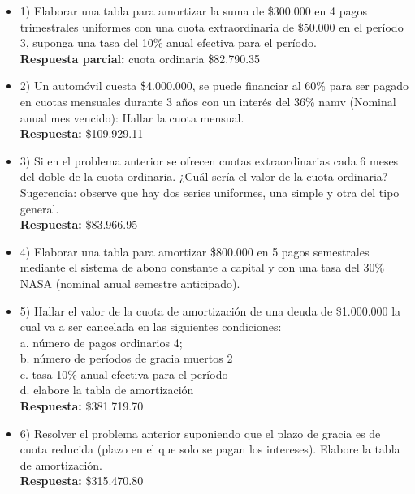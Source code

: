 \begin{itemize}
	\item 1)	Elaborar una tabla para amortizar la suma de \$300.000 en 4 pagos trimestrales uniformes con una cuota extraordinaria de \$50.000 en el período 3, suponga una tasa del 10\% anual efectiva para el período. \\
	\textbf{Respuesta parcial:} cuota ordinaria \$82.790.35
	\medskip
	
	\item 2)	Un automóvil cuesta \$4.000.000, se puede financiar al 60\% para ser pagado en cuotas mensuales durante 3 años con un interés del 36\% namv (Nominal anual mes vencido): Hallar la cuota mensual.\\
	\textbf{ Respuesta:} \$109.929.11
	\medskip
	
	\item 3)	Si en el problema anterior se ofrecen cuotas extraordinarias cada 6 meses del doble de la cuota ordinaria. ¿Cuál sería el valor de la cuota ordinaria?\\
	
	Sugerencia: observe que hay dos series uniformes, una simple y otra del tipo general.\\
	\textbf{Respuesta:} \$83.966.95
	\medskip
	
	\item 4)	Elaborar una tabla para amortizar \$800.000 en 5 pagos semestrales mediante el sistema de abono constante a capital y con una tasa del 30\% NASA (nominal anual semestre anticipado). 
	\medskip
	
	\item 5)	 Hallar el valor de la cuota de amortización de una deuda de \$1.000.000 la cual va a ser cancelada en las siguientes condiciones:\\
	
	a.	número de pagos ordinarios 4;\\
	b.	número de períodos de gracia muertos 2\\
	c.	tasa 10\% anual efectiva para el período \\
	d.	elabore la tabla de amortización\\
	\textbf{ Respuesta:} \$381.719.70
	\medskip
	
	\item 6)	Resolver el problema anterior suponiendo que el plazo de gracia es de cuota reducida (plazo en el que solo se pagan los intereses). Elabore la tabla de amortización.\\
	\textbf{Respuesta: }\$315.470.80
	\medskip
	

\end{itemize}
